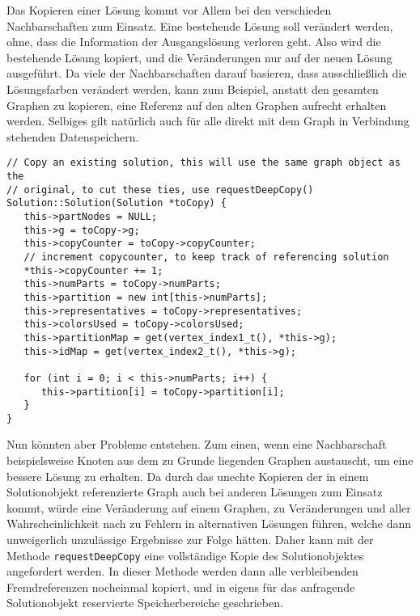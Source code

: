 Das Kopieren einer Lösung kommt vor Allem bei den verschieden Nachbarschaften zum Einsatz. Eine bestehende Lösung soll verändert werden, ohne, dass die Information der Ausgangslösung verloren geht. Also wird
die bestehende Lösung kopiert, und die Veränderungen nur auf der neuen Lösung ausgeführt. Da viele der Nachbarschaften darauf basieren, dass ausschließlich die Lösungsfarben verändert werden, kann zum Beispiel, 
anstatt den gesamten Graphen zu kopieren, eine Referenz auf den alten Graphen aufrecht erhalten werden. Selbiges gilt natürlich auch für alle direkt mit dem Graph in Verbindung stehenden Datenspeichern. 

\singlespacing
\begin{lstlisting}[caption={Der Kopierkonstruktor der Solutionklasse},label={lst:copy}]
// Copy an existing solution, this will use the same graph object as the 
// original, to cut these ties, use requestDeepCopy()
Solution::Solution(Solution *toCopy) {
   this->partNodes = NULL;
   this->g = toCopy->g;
   this->copyCounter = toCopy->copyCounter;
   // increment copycounter, to keep track of referencing solution
   *this->copyCounter += 1;
   this->numParts = toCopy->numParts;
   this->partition = new int[this->numParts];
   this->representatives = toCopy->representatives;
   this->colorsUsed = toCopy->colorsUsed;
   this->partitionMap = get(vertex_index1_t(), *this->g);
   this->idMap = get(vertex_index2_t(), *this->g);
   
   for (int i = 0; i < this->numParts; i++) {
      this->partition[i] = toCopy->partition[i];
   }
}
\end{lstlisting}

Nun könnten aber Probleme entstehen. Zum einen, wenn eine Nachbarschaft beispielsweise Knoten aus dem zu Grunde liegenden Graphen austauscht, um eine bessere Lösung zu erhalten. Da durch das unechte Kopieren
der in einem Solutionobjekt referenzierte Graph auch bei anderen Lösungen zum Einsatz kommt, würde eine Veränderung auf einem Graphen, zu Veränderungen und aller Wahrscheinlichkeit nach zu Fehlern in alternativen
Lösungen führen, welche dann unweigerlich unzulässige Ergebnisse zur Folge hätten. Daher kann mit der Methode \texttt{requestDeepCopy} eine vollständige Kopie des Solutionobjektes angefordert werden. In dieser
Methode werden dann alle verbleibenden Fremdreferenzen nocheinmal kopiert, und in eigens für das anfragende Solutionobjekt reservierte Speicherbereiche geschrieben.

